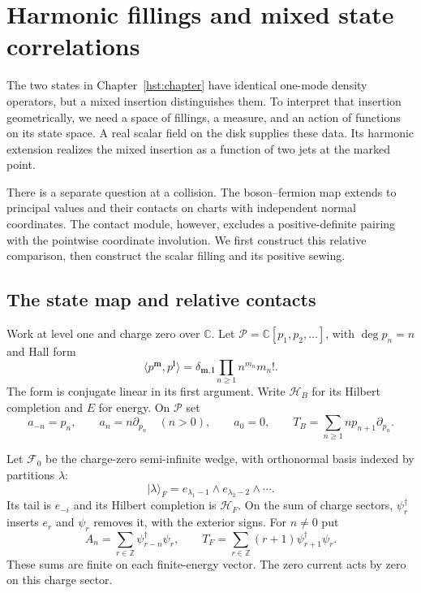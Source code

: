 \section{Harmonic fillings and mixed state correlations}
\label{hfill:section}

The two states in Chapter~\ref{hst:chapter} have identical
one-mode density operators, but a mixed insertion distinguishes them.
To interpret that insertion geometrically, we need a space of fillings,
a measure, and an action of functions on its state space.
A real scalar field on the disk supplies these data.
Its harmonic extension realizes the mixed insertion as a function
of two jets at the marked point.

There is a separate question at a collision.
The boson--fermion map extends to principal values and their contacts
on charts with independent normal coordinates.
The contact module, however, excludes a positive-definite pairing with the
pointwise coordinate involution.
We first construct this relative comparison, then construct the
scalar filling and its positive sewing.

\subsection{The state map and relative contacts}

Work at level one and charge zero over $\mathbb C$.
Let $\mathcal P=\mathbb C[p_1,p_2,\ldots]$, with
$\deg p_n=n$ and Hall form
\[
 \langle p^{\boldsymbol m},p^{\boldsymbol l}\rangle
 =\delta_{\boldsymbol m,\boldsymbol l}
       \prod_{n\geq1}n^{m_n}m_n!.
\]
The form is conjugate linear in its first argument.
Write $\mathcal H_B$ for its Hilbert completion and $E$ for energy.
On $\mathcal P$ set
\[
 a_{-n}=p_n,\qquad a_n=n\partial_{p_n}\quad(n>0),
 \qquad a_0=0,
 \qquad T_B=\sum_{n\geq1}n p_{n+1}\partial_{p_n}.
\]

Let $\mathcal F_0$ be the charge-zero semi-infinite wedge, with
orthonormal basis indexed by partitions $\lambda$:
\[
 |\lambda\rangle_F
 =e_{\lambda_1-1}\wedge e_{\lambda_2-2}\wedge\cdots.
\]
Its tail is $e_{-i}$ and its Hilbert completion is $\mathcal H_F$.
On the sum of charge sectors, $\psi_r^\dagger$ inserts $e_r$ and
$\psi_r$ removes it, with the exterior signs.
For $n\ne0$ put
\[
 A_n=\sum_{r\in\mathbb Z}\psi_{r-n}^\dagger\psi_r,
 \qquad
 T_F=\sum_{r\in\mathbb Z}(r+1)\psi_{r+1}^\dagger\psi_r.
\]
These sums are finite on each finite-energy vector.
The zero current acts by zero on this charge sector.

